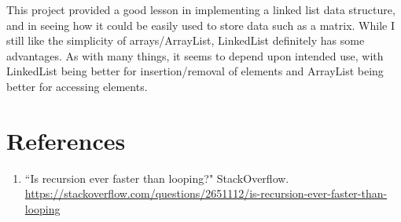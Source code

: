 \documentclass[12pt, titlepage]{article}
\begin{document}
This project provided a good lesson in implementing a linked list data structure, and in seeing how it could be easily used to store data such as a matrix. While I still like the simplicity of arrays/ArrayList, LinkedList definitely has some advantages. As with many things, it seems to depend upon intended use, with LinkedList being better for insertion/removal of elements and ArrayList being better for accessing elements.  

\newpage

\section{References}
\begin{enumerate}
	\item ``Is recursion ever faster than looping?" StackOverflow. \url{https://stackoverflow.com/questions/2651112/is-recursion-ever-faster-than-looping}
\end{enumerate}
\end{document}
